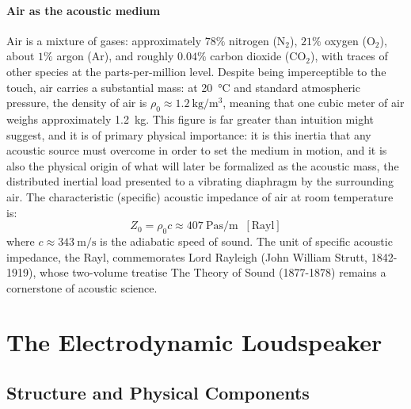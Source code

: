 \paragraph{Air as the acoustic medium} Air is a mixture of gases: approximately \(78\%\) nitrogen (\(\mathrm{N_2}\)), \(21\%\) oxygen (\(\mathrm{O_2}\)), about \(1\%\) argon (\(\mathrm{Ar}\)), and roughly \(0.04\%\) carbon dioxide (\(\mathrm{CO_2}\)), with traces of other species at the parts-per-million level. Despite being imperceptible to the touch, air carries a substantial mass: at \SI{20}{\degreeCelsius} and standard atmospheric pressure, the density of air is \(\rho_0 \approx \SI{1.2}{\kilo\gram\per\cubic\meter}\), meaning that one cubic meter of air weighs approximately \SI{1.2}{\kilo\gram}. This figure is far greater than intuition might suggest, and it is of primary physical importance: it is this inertia that any acoustic source must overcome in order to set the medium in motion, and it is also the physical origin of what will later be formalized as the acoustic mass, the distributed inertial load presented to a vibrating diaphragm by the surrounding air. The characteristic (specific) acoustic impedance of air at room temperature is:
\[
Z_0 = \rho_0 c \approx \SI{407}{\pascal\second\per\meter} \;\; [\text{Rayl}]
\]
where \(c \approx \SI{343}{\meter\per\second}\) is the adiabatic speed of sound. The unit of specific acoustic impedance, the Rayl, commemorates Lord Rayleigh (John William Strutt, 1842-1919), whose two-volume treatise The Theory of Sound (1877-1878) remains a cornerstone of acoustic science.

\section{The Electrodynamic Loudspeaker}

\subsection{Structure and Physical Components}

